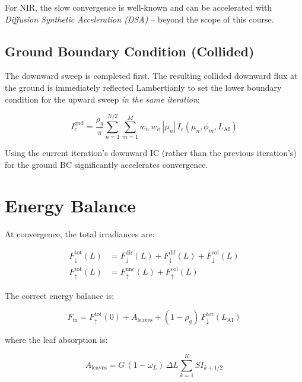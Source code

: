 \documentclass[12pt]{article}
\begin{document}
For NIR, the slow convergence is well-known and can be accelerated with
\emph{Diffusion Synthetic Acceleration (DSA)} -- beyond the scope of this course.

\subsection{Ground Boundary Condition (Collided)}

The downward sweep is completed first. The resulting collided downward flux at
the ground is immediately reflected Lambertianly to set the lower boundary
condition for the upward sweep \emph{in the same iteration}:

\begin{equation}
  I_c^\mathrm{gnd} = \frac{\rho_g}{\pi}
  \sum_{n=1}^{N/2}\sum_{m=1}^{M}
  w_n\,w_\phi\,|\mu_n|\,I_c(\mu_n,\phi_m,L_\mathrm{AI})
\end{equation}

Using the current iteration's downward IC (rather than the previous iteration's)
for the ground BC significantly accelerates convergence.

\section{Energy Balance}

At convergence, the total irradiances are:

\begin{align}
  F_\downarrow^\mathrm{tot}(L) &= F_\downarrow^\mathrm{dir}(L)
    + F_\downarrow^\mathrm{dif}(L) + F_\downarrow^\mathrm{col}(L) \\
  F_\uparrow^\mathrm{tot}(L) &= F_\uparrow^\mathrm{unc}(L)
    + F_\uparrow^\mathrm{col}(L)
\end{align}

The correct energy balance is:

\begin{equation}
  \boxed{
  F_\mathrm{in} = F_\uparrow^\mathrm{tot}(0)
    + A_\mathrm{leaves}
    + (1 - \rho_g)\,F_\downarrow^\mathrm{tot}(L_\mathrm{AI})
  }
\end{equation}

where the leaf absorption is:

\begin{equation}
  A_\mathrm{leaves} = G\,(1-\omega_L)\,\Delta L
  \sum_{k=1}^{K} SI_{k+1/2}
\end{equation}
\end{document}
